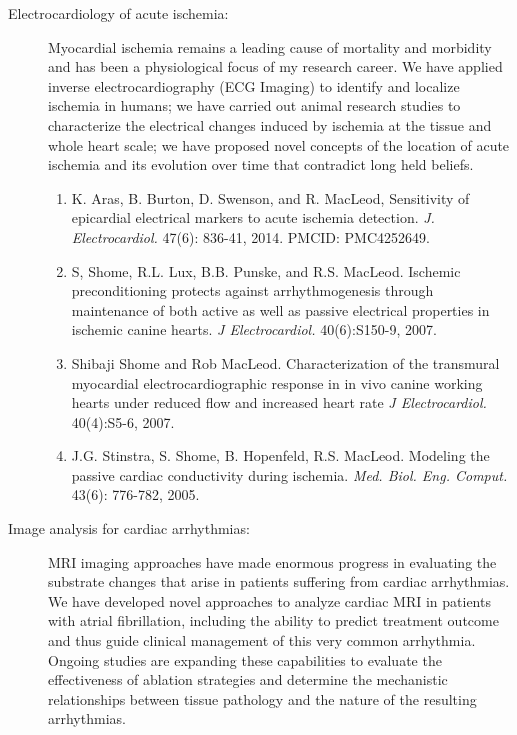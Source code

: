 \documentclass[10pt]{article}
\begin{document}
\begin{description}
  \item [Electrocardiology of acute ischemia:] Myocardial ischemia remains
    a leading cause of mortality and morbidity and has been a physiological
    focus of my research career.  We have applied inverse
    electrocardiography (ECG Imaging) to identify and localize ischemia in
    humans; we have carried out animal research studies to characterize
    the electrical changes induced by ischemia at the tissue and whole
    heart scale; we have proposed novel concepts of the location of acute
    ischemia and its evolution over time that contradict long held
    beliefs. 
    \begin{enumerate}
      \item K. Aras, B. Burton, D. Swenson, and R. MacLeod, Sensitivity of
        epicardial electrical markers to acute ischemia detection.
        \emph{J. Electrocardiol.} 47(6): 836-41, 2014.  PMCID: PMC4252649.
      \item S, Shome, R.L. Lux, B.B. Punske, and R.S. MacLeod.  Ischemic
        preconditioning protects against arrhythmogenesis through
        maintenance of both active as well as passive electrical properties
        in ischemic canine hearts. \emph{J Electrocardiol.} 40(6):S150-9,
        2007.
      \item Shibaji Shome and Rob MacLeod. Characterization of the
        transmural myocardial electrocardiographic response in in vivo
        canine working hearts under reduced flow and increased heart rate
        \emph{J Electrocardiol.}  40(4):S5-6, 2007.
      \item J.G. Stinstra, S. Shome, B. Hopenfeld, R.S. MacLeod. Modeling
        the passive cardiac conductivity during
        ischemia. \emph{Med. Biol. Eng.  Comput.} 43(6): 776-782, 2005.
    \end{enumerate}

  \item [Image analysis for cardiac arrhythmias:] MRI imaging approaches
    have made enormous progress in evaluating the substrate changes that
    arise in patients suffering from cardiac arrhythmias. We have developed
    novel approaches to analyze cardiac MRI in patients with atrial
    fibrillation, including the ability to predict treatment outcome and
    thus guide clinical management of this very common arrhythmia.  Ongoing
    studies are expanding these capabilities to evaluate the effectiveness
    of ablation strategies and determine the mechanistic relationships
    between tissue pathology and the nature of the resulting arrhythmias. 


\end{description}
\end{document}
